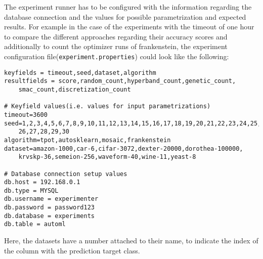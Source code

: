 The experiment runner has to be configured with the information regarding the database connection and the values for possible parametrization and expected results.
For example in the case of the experiments with the timeout of one hour to compare the different approaches regarding their accuracy scores and additionally to count the optimizer runs of frankenstein, the experiment configuration file(\texttt{experiment.properties}) could look like the following:
\begin{Verbatim}[fontsize=\scriptsize]
keyfields = timeout,seed,dataset,algorithm
resultfields = score,random_count,hyperband_count,genetic_count,
    smac_count,discretization_count

# Keyfield values(i.e. values for input parametrizations)
timeout=3600
seed=1,2,3,4,5,6,7,8,9,10,11,12,13,14,15,16,17,18,19,20,21,22,23,24,25,
    26,27,28,29,30
algorithm=tpot,autosklearn,mosaic,frankenstein
dataset=amazon-1000,car-6,cifar-3072,dexter-20000,dorothea-100000,
    krvskp-36,semeion-256,waveform-40,wine-11,yeast-8

# Database connection setup values
db.host = 192.168.0.1
db.type = MYSQL
db.username = experimenter
db.password = password123
db.database = experiments
db.table = automl
\end{Verbatim}
Here, the datasets have a number attached to their name, to indicate the index of the column with the prediction target class.

